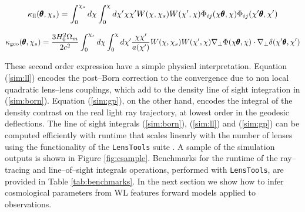 \documentclass[reprint,aps,prd,superscriptaddress,showkeys,showpacs]{revtex4-1}
\newcommand{\ttt}[1]{\texttt{#1}}
\newcommand\pt{\pmb{\theta}}
\begin{document}
\begin{widetext}

\begin{equation}
\label{sim:ll}
\kappa_{\rm ll}(\pt,\chi_s) = \int_0^{\chi_s}d\chi\int_0^\chi d\chi' \chi\chi' W(\chi,\chi_s)W(\chi',\chi)\Phi_{ij}(\chi\pt,\chi)\Phi_{ij}(\chi'\pt,\chi')
\end{equation}

\begin{equation}
\label{sim:gp}
\kappa_{\rm geo}(\pt,\chi_s) = \frac{3H_0^2\Omega_m}{2c^2}\int_0^{\chi_s}d\chi\int_0^\chi d\chi' \frac{\chi\chi'}{a(\chi')} W(\chi,\chi_s)W(\chi',\chi)\nabla_\perp\Phi(\chi\pt,\chi)\cdot\nabla_\perp\delta(\chi'\pt,\chi')
\end{equation}

\end{widetext}
%
These second order expression have a simple physical interpretation. Equation (\ref{sim:ll}) encodes the post--Born correction to the convergence due to non local quadratic lens--lens couplings, which add to the density line of sight integration in (\ref{sim:born}). Equation (\ref{sim:gp}), on the other hand, encodes the integral of the density contrast on the real light ray trajectory, at lowest order in the geodesic deflections. The line of sight integrals (\ref{sim:born}), (\ref{sim:ll}) and (\ref{sim:gp}) can be computed efficiently with runtime that scales linearly with the number of lenses using the functionality of the \ttt{LensTools} suite \citep{LensTools-paper}. A sample of the simulation outputs is shown in Figure \ref{fig:csample}. Benchmarks for the runtime of the ray--tracing and line--of--sight integrals operations, performed with \ttt{LensTools}, are provided in Table \ref{tab:benchmarks}. 
In the next section we show how to infer cosmological parameters from WL features forward models applied to observations.  
\end{document}
